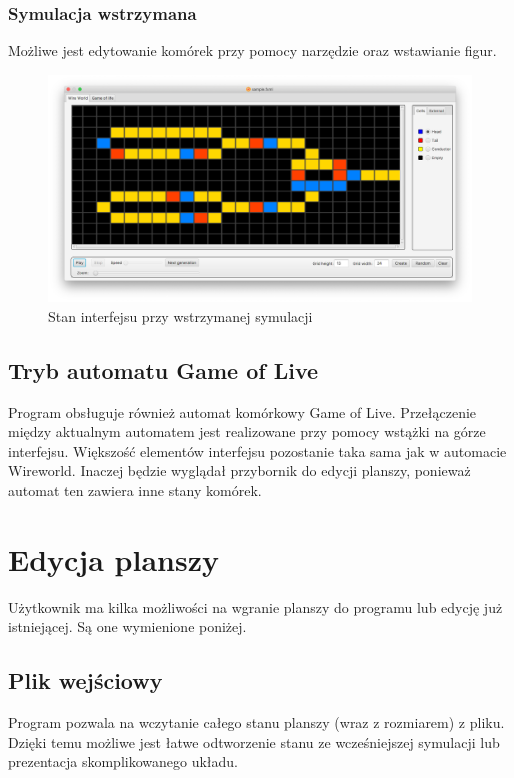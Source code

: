 \documentclass{report}
\begin{document}
\subsection{Symulacja wstrzymana}
Możliwe jest edytowanie komórek przy pomocy narzędzie oraz wstawianie figur.

\begin{figure}[H]
    \centering
    \includegraphics[width=\textwidth]{gui-paused}
    \caption{Stan interfejsu przy wstrzymanej symulacji}
\end{figure}

\section{Tryb automatu Game of Live}
Program obsługuje również automat komórkowy Game of Live. Przełączenie między aktualnym automatem jest realizowane przy pomocy wstążki na górze interfejsu.
Większość elementów interfejsu pozostanie taka sama jak w automacie Wireworld. Inaczej będzie wyglądał przybornik do edycji planszy, ponieważ automat ten zawiera inne stany komórek.


\chapter{Edycja planszy}
Użytkownik ma kilka możliwości na wgranie planszy do programu lub edycję już istniejącej. Są one wymienione poniżej.

\section{Plik wejściowy}  \label{format}
Program pozwala na wczytanie całego stanu planszy (wraz z rozmiarem) z pliku. Dzięki temu możliwe jest łatwe odtworzenie stanu ze wcześniejszej symulacji lub prezentacja skomplikowanego układu.
\end{document}
